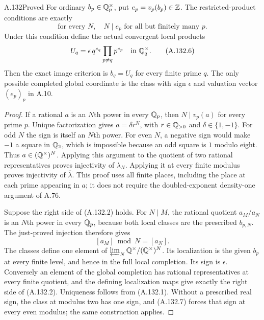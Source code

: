 \begin{statement}{A.132}{Proved}
For ordinary \(b_p\in\mathbb Q_p^\times\), put \(e_p=v_p(b_p)\in\mathbb Z\).
The restricted-product conditions are exactly
\[
       \text{for every }N,\quad N\mid e_p
                             \text{ for all but finitely many }p.
\tag{A.132.5}
\]
Under this condition define the actual convergent local products
\[
 U_q=\epsilon\,q^{e_q}\prod_{p\ne q}p^{e_p}
                         \quad\text{in }\mathbb Q_q^\times .
\tag{A.132.6}
\]
Then the exact image criterion is \(b_q=U_q\) for every
finite prime \(q\).  The only possible completed global
coordinate is the class with sign \(\epsilon\) and valuation
vector \((e_p)_p\) in A.10.
\end{statement}
\begin{proof}
If a rational \(a\) is an \(N\)th power in every \(\mathbb Q_p\),
then \(N\mid v_p(a)\) for every prime \(p\).
Unique factorization gives \(a=\delta r^N\), with
\(r\in\mathbb Q_{>0}\) and \(\delta\in\{1,-1\}\).
For odd \(N\) the sign is itself an \(N\)th power.
For even \(N\), a negative sign would make \(-1\)
a square in \(\mathbb Q_2\), which is impossible because an
odd square is \(1\) modulo eight.
Thus \(a\in(\mathbb Q^\times)^N\).
Applying this argument to the quotient of two rational
representatives proves injectivity of \(\lambda_N\).
Applying it at every finite modulus proves injectivity
of \(\widehat\lambda\).
This proof uses all finite places, including the place
at each prime appearing in \(a\); it does not require
the doubled-exponent density-one argument of A.76.

Suppose the right side of (A.132.2) holds.
For \(N\mid M\), the rational quotient \(a_M/a_N\)
is an \(N\)th power in every \(\mathbb Q_p\), because both
local classes are the prescribed \(b_{p,N}\).
The just-proved injection therefore gives
\[
                 [a_M]\bmod N=[a_N].
\tag{A.132.7}
\]
The classes define one element of
\(\varprojlim_N\mathbb Q^\times/(\mathbb Q^\times)^N\).
Its localization is the given \(b_p\) at every finite
level, and hence in the full local completion.
Its sign is \(\epsilon\).
Conversely an element of the global completion has
rational representatives at every finite quotient,
and the defining localization maps give exactly the
right side of (A.132.2).
Uniqueness follows from (A.132.1).
Without a prescribed real sign, the class at modulus
two has one sign, and (A.132.7) forces that sign at
every even modulus; the same construction applies.


\end{proof}
